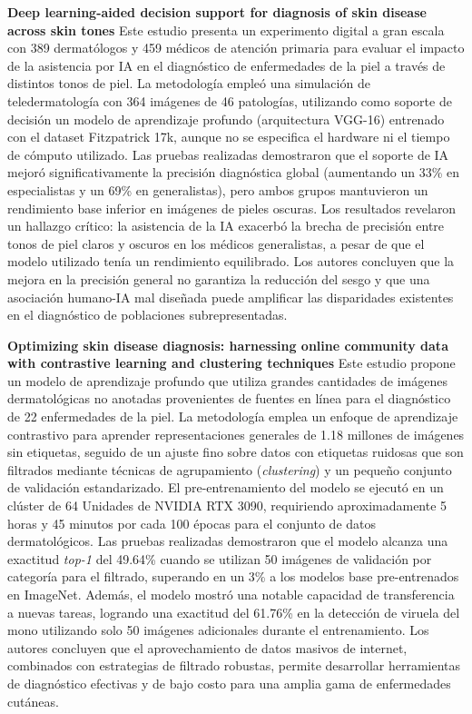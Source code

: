 \documentclass[11pt, a4paper]{article}
\begin{document}
\textbf{Deep learning-aided decision support for diagnosis of skin disease across skin tones} \cite{groh_deep_2024}
Este estudio presenta un experimento digital a gran escala con 389 dermatólogos y 459 médicos de atención primaria para evaluar el impacto de la asistencia por IA en el diagnóstico de enfermedades de la piel a través de distintos tonos
de piel. La metodología empleó una simulación de teledermatología con 364 imágenes de 46 patologías, utilizando como soporte de decisión un modelo de aprendizaje profundo (arquitectura VGG-16) entrenado con el dataset Fitzpatrick 17k,
aunque no se especifica el hardware ni el tiempo de cómputo utilizado. Las pruebas realizadas demostraron que el soporte de IA mejoró significativamente la precisión diagnóstica global (aumentando un 33\% en especialistas y un 69\% en
generalistas), pero ambos grupos mantuvieron un rendimiento base inferior en imágenes de pieles oscuras. Los resultados revelaron un hallazgo crítico: la asistencia de la IA exacerbó la brecha de precisión entre tonos de piel claros y
oscuros en los médicos generalistas, a pesar de que el modelo utilizado tenía un rendimiento equilibrado. Los autores concluyen que la mejora en la precisión general no garantiza la reducción del sesgo y que una asociación humano-IA mal
diseñada puede amplificar las disparidades existentes en el diagnóstico de poblaciones subrepresentadas.

\textbf{Optimizing skin disease diagnosis: harnessing online community data with contrastive learning and clustering techniques} \cite{shen_optimizing_2024}
Este estudio propone un modelo de aprendizaje profundo que utiliza grandes cantidades de imágenes dermatológicas no anotadas provenientes de fuentes en línea para el diagnóstico de 22 enfermedades de la piel. La metodología emplea un
enfoque de aprendizaje contrastivo para aprender representaciones generales de 1.18 millones de imágenes sin etiquetas, seguido de un ajuste fino sobre datos con etiquetas ruidosas que son filtrados mediante técnicas de agrupamiento
(\textit{clustering}) y un pequeño conjunto de validación estandarizado. El pre-entrenamiento del modelo se ejecutó en un clúster de 64 Unidades de NVIDIA RTX 3090, requiriendo aproximadamente 5 horas y 45 minutos por cada 100 épocas
para el conjunto de datos dermatológicos. Las pruebas realizadas demostraron que el modelo alcanza una exactitud \textit{top-1} del 49.64\% cuando se utilizan 50 imágenes de validación por categoría para el filtrado, superando en un
3\% a los modelos base pre-entrenados en ImageNet. Además, el modelo mostró una notable capacidad de transferencia a nuevas tareas, logrando una exactitud del 61.76\% en la detección de viruela del mono utilizando solo 50 imágenes
adicionales durante el entrenamiento. Los autores concluyen que el aprovechamiento de datos masivos de internet, combinados con estrategias de filtrado robustas, permite desarrollar herramientas de diagnóstico efectivas y de bajo costo
para una amplia gama de enfermedades cutáneas.
\end{document}
